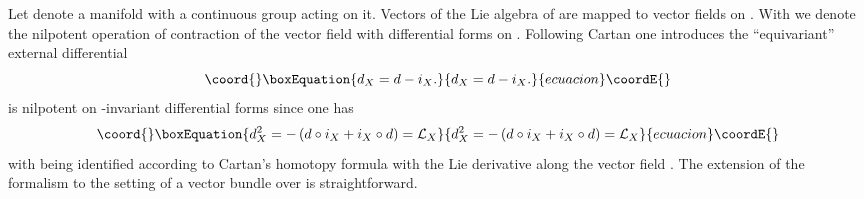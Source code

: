 \documentclass[a4paper,12pt]{article}
\begin{document}
Let \coordHE{} denote a manifold with a continuous group \coordHE{} 
acting on it. Vectors \coordHE{} of the Lie algebra \coordHE{} of \coordHE{} 
are mapped to vector fields \coordHE{} on \coordHE{}. With \coordHE{} we denote the 
nilpotent operation of contraction of the vector field \coordHE{} with 
differential forms on  \coordHE{}. Following Cartan \cite{cartan} 
one introduces the ``equivariant'' external differential 
\begin{equation}\coord{}\boxEquation{
d_X =d-i_X.
\label{equivdiff}
}{
d_X =d-i_X.
}{ecuacion}\coordE{}\end{equation}
\coordHE{} is nilpotent on \coordHE{}-invariant differential forms since 
one has 
\begin{equation}\coord{}\boxEquation{
d_X^2 =-\left(d \circ i_X + i_X \circ d \right)={\cal L}_X  
}{
d_X^2 =-\left(d \circ i_X + i_X \circ d \right)={\cal L}_X  
}{ecuacion}\coordE{}\end{equation}             
with \coordHE{} being identified according to Cartan's homotopy 
formula with the Lie derivative along the vector field \coordHE{}. The 
extension of the formalism to the setting of a vector bundle over 
\coordHE{} is straightforward. 
\end{document}

